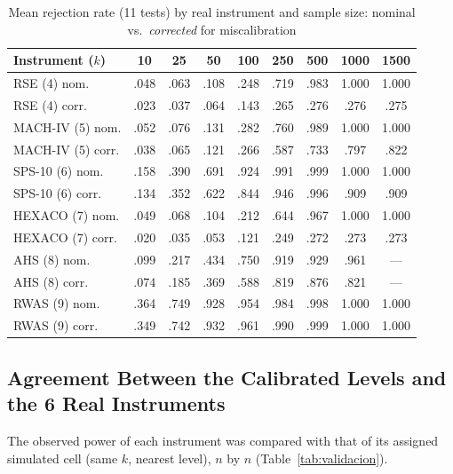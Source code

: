 \documentclass[man,mask,donotrepeattitle,floatsintext]{apa7}
\begin{document}
\begin{table}[H]
\caption{Mean rejection rate (11 tests) by real instrument and sample size: nominal vs.\ \emph{corrected} for miscalibration}
\label{tab:potencia-instrumento}
\begin{tabular}{lcccccccc}
\toprule
Instrument ($k$) & 10 & 25 & 50 & 100 & 250 & 500 & 1000 & 1500 \\
\midrule
RSE (4) nom. & .048 & .063 & .108 & .248 & .719 & .983 & 1.000 & 1.000 \\
RSE (4) corr. & .023 & .037 & .064 & .143 & .265 & .276 & .276 & .275 \\
MACH-IV (5) nom. & .052 & .076 & .131 & .282 & .760 & .989 & 1.000 & 1.000 \\
MACH-IV (5) corr. & .038 & .065 & .121 & .266 & .587 & .733 & .797 & .822 \\
SPS-10 (6) nom. & .158 & .390 & .691 & .924 & .991 & .999 & 1.000 & 1.000 \\
SPS-10 (6) corr. & .134 & .352 & .622 & .844 & .946 & .996 & .909 & .909 \\
HEXACO (7) nom. & .049 & .068 & .104 & .212 & .644 & .967 & 1.000 & 1.000 \\
HEXACO (7) corr. & .020 & .035 & .053 & .121 & .249 & .272 & .273 & .273 \\
AHS (8) nom. & .099 & .217 & .434 & .750 & .919 & .929 & .961 & --- \\
AHS (8) corr. & .074 & .185 & .369 & .588 & .819 & .876 & .821 & --- \\
RWAS (9) nom. & .364 & .749 & .928 & .954 & .984 & .998 & 1.000 & 1.000 \\
RWAS (9) corr. & .349 & .742 & .932 & .961 & .990 & .999 & 1.000 & 1.000 \\
\bottomrule
\end{tabular}
\end{table}

\subsection{Agreement Between the Calibrated Levels and the 6 Real Instruments}
\label{sec:res-validacion}

The observed power of each instrument was compared with that of its assigned simulated cell (same $k$, nearest level), $n$ by $n$ (Table~\ref{tab:validacion}).
\end{document}
